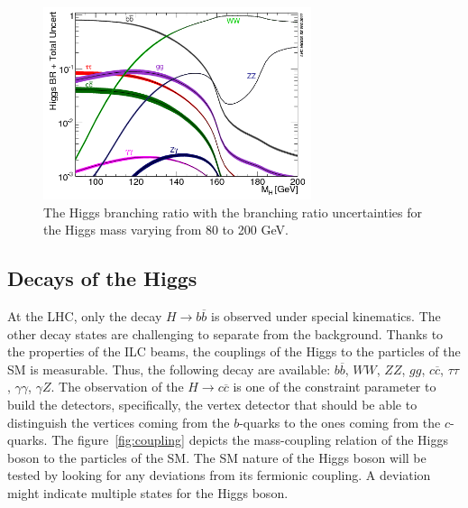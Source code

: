        
    \begin{figure}[!h]
      \centering
      \includegraphics[width = 0.7\textwidth]{Pictures/Higgs/BRTotalUncertBands_lm.png}
      \caption{The Higgs branching ratio with the branching ratio uncertainties for the Higgs mass varying from 80 to 200 GeV\cite{Denner:2011mq}.}
      \label{fig:higgsProd}
    \end{figure}

    \subsection{Decays of the Higgs}

    At the \gls{LHC}, only the decay $H \rightarrow b\overline{b}$ is observed under special kinematics. 
    The other decay states are challenging to separate from the background.
    Thanks to the properties of the \gls{ILC} beams, the couplings of the Higgs to the particles of the \gls{SM} is measurable.
    Thus, the following decay are available: $b\overline{b}$, $WW$, $ZZ$, $gg$, $c\overline{c}$, $\tau \tau$, $\gamma \gamma$, $\gamma Z$.
    The observation of the $H \rightarrow c\overline{c}$ is one of the constraint parameter to build the detectors, specifically, the vertex detector that should be able to distinguish the vertices coming from the $b$-quarks to the ones coming from the $c$-quarks.
    The figure~\ref{fig:coupling} depicts the mass-coupling relation of the Higgs boson to the particles of the \gls{SM}.
    The \gls{SM} nature of the Higgs boson will be tested by looking for any deviations from its fermionic coupling.
    A deviation might indicate multiple states for the Higgs boson. 


